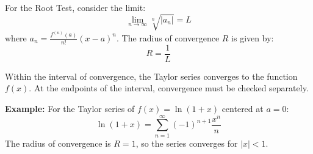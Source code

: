 \documentclass{article}
\begin{document}
For the Root Test, consider the limit:
\[ \lim_{n \to \infty} \sqrt[n]{|a_n|} = L \]
where \(a_n = \frac{f^{(n)}(a)}{n!} (x-a)^n\). The radius of convergence \(R\) is given by:
\[ R = \frac{1}{L} \]

Within the interval of convergence, the Taylor series converges to the function \(f(x)\). At the endpoints of the interval, convergence must be checked separately.

\textbf{Example:}
For the Taylor series of \(f(x) = \ln(1+x)\) centered at \(a = 0\):
\[ \ln(1+x) = \sum_{n=1}^{\infty} (-1)^{n+1} \frac{x^n}{n} \]
The radius of convergence is \(R = 1\), so the series converges for \(|x| < 1\).
\end{document}
